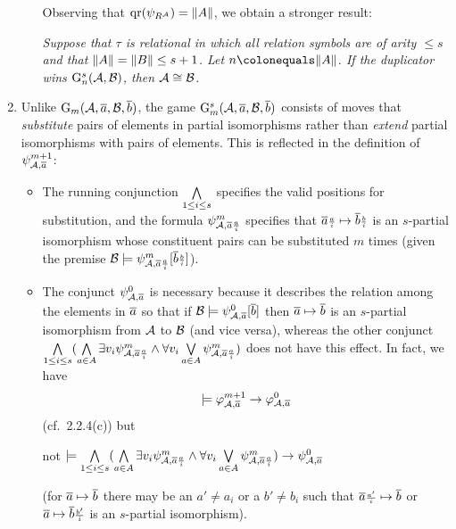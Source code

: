 \begin{enumerate}[1.]
\begin{enumerate}[(a)]
\begin{remark}
Observing that $\mathrm{qr}(\psi_{R^{\mathcal{A}}}) = \|A\|$, we obtain a stronger result:
\begin{center}
\emph{Suppose that $\tau$ is relational in which all relation symbols are of arity $\leq s$ and that $\|A\| = \|B\| \leq s + 1$. Let $n \defas \card{A}$. If the duplicator wins $\game[s]{n}(\strct{A}, \strct{B})$, then $\mathcal{A} \cong \mathcal{B}$.}
\end{center}
\end{remark}
\end{enumerate}
%
\item {} Unlike $\game{m}(\strct{A}, \vect{a}, \strct{B}, \vect{b})$, the game $\game[s]{m}(\strct{A}, \vect{a}, \strct{B}, \vect{b})$ consists of moves that \emph{substitute} pairs of elements in partial isomorphisms rather than \emph{extend} partial isomorphisms with pairs of elements. This is reflected in the definition of $\ityp{m + 1}{\strct{A}, \vect{a}}$:
\begin{itemize}
\item The running conjunction $\bigwedge\limits_{1 \leq i \leq s}$ specifies the valid positions for substitution, and the formula $\ityp{m}{\strct{A}, \vect{a}\sbst{a}{i}}$ specifies that $\overline{a}{\scriptstyle\frac{a}{i}} \mapsto \overline{b}{\scriptstyle\frac{b}{i}}$ is an $s$-partial isomorphism whose constituent pairs can be substituted $m$ times (given the premise $\strct{B} \satis \ityp{m}{\strct{A}, \vect{a}\sbst{a}{i}}[\vect{b}\sbst{b}{i}]$).
\item The conjunct $\ityp{0}{\strct{A}, \vect{a}}$ is necessary because it describes the relation among the elements in $\overline{a}$ so that if $\strct{B} \satis \ityp{0}{\strct{A}, \vect{a}}[\vect{b}]$ then $\overline{a} \mapsto \overline{b}$ is an $s$-partial isomorphism from $\mathcal{A}$ to $\mathcal{B}$ (and vice versa), whereas the other conjunct $\bland\limits_{1 \leq i \leq s}(\bland\limits_{a \in A} \exists v_i \ityp{m}{\strct{A}, \vect{a}\sbst{a}{i}} \land \forall v_i \blor\limits_{a \in A} \ityp{m}{\strct{A}, \vect{a}\sbst{a}{i}})$ does not have this effect. In fact, we have
\[
\models \varphi^{m + 1}_{\mathcal{A}, \overline{a}} \rightarrow \varphi^{0}_{\mathcal{A}, \overline{a}}
\]
(cf.\ 2.2.4(c)) but
\begin{center}
not $\consq \bland\limits_{1 \leq i \leq s}(\bland\limits_{a \in A} \exists v_i \ityp{m}{\strct{A}, \vect{a}\sbst{a}{i}} \land \forall v_i \blor\limits_{a \in A} \ityp{m}{\strct{A}, \vect{a}\sbst{a}{i}}) \lthen \ityp{0}{\strct{A}, \vect{a}}$
\end{center}
(for $\overline{a} \mapsto \overline{b}$ there may be an $a' \neq a_i$ or a $b' \neq b_i$ such that $\overline{a}{\scriptstyle\frac{a'}{i}} \mapsto \overline{b}$ or $\overline{a} \mapsto \overline{b}{\scriptstyle\frac{b'}{i}}$ is an $s$-partial isomorphism).


\end{itemize}
\end{enumerate}
